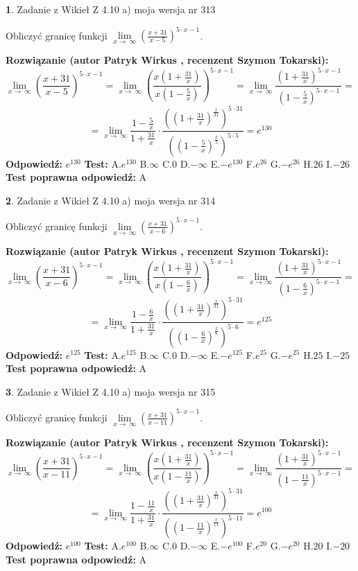 \documentclass[12pt, a4paper]{article}
\theoremstyle{definition} %
\newtheorem{zad}{}
\newcommand{\zadStart}[1]{\begin{zad}#1\newline}
\newcommand{\zadStop}{\end{zad}}
\newcommand{\rozwStart}[2]{\noindent \textbf{Rozwiązanie (autor #1 , recenzent #2): }\newline}
\newcommand{\rozwStop}{\newline}
\newcommand{\odpStart}{\noindent \textbf{Odpowiedź:}\newline}
\newcommand{\odpStop}{\newline}
\newcommand{\testStart}{\noindent \textbf{Test:}\newline}
\newcommand{\testStop}{\newline}
\newcommand{\kluczStart}{\noindent \textbf{Test poprawna odpowiedź:}\newline}
\newcommand{\kluczStop}{\newline}
\begin{document}
\zadStart{Zadanie z Wikieł Z 4.10 a) moja wersja nr 313}

Obliczyć granicę funkcji  $\lim\limits_{x\to\ \infty}(\frac{x+31}{x-5})^{5\cdot x-1}$.
\zadStop
\rozwStart{Patryk Wirkus}{Szymon Tokarski}
$$\lim\limits_{x\to\ \infty}(\frac{x+31}{x-5})^{5\cdot x-1} = \lim\limits_{x\to\ \infty}(\frac{x(1+\frac{31}{x})}{x(1-\frac{5}{x})})^{5\cdot x-1}=\lim\limits_{x\to\ \infty}\frac{(1+\frac{31}{x})^{5\cdot x-1}}{(1-\frac{5}{x})^{5\cdot x-1}}=$$
$$=\lim\limits_{x\to\ \infty}\frac{1-\frac{5}{x}}{1+\frac{31}{x}}\cdot\frac{((1+\frac{31}{x})^{\frac{x}{31}})^{5\cdot31}}{((1-\frac{5}{x})^{\frac{x}{5}})^{5\cdot5}}=e^{130}$$
\rozwStop
\odpStart
$e^{130}$
\odpStop
\testStart
A.$e^{130}$ B.$\infty$ C.$0$ D.$-\infty$ E.$-e^{130}$
F.$e^{26}$ G.$-e^{26}$
H.$26$
I.$-26$
\testStop
\kluczStart
A
\kluczStop



\zadStart{Zadanie z Wikieł Z 4.10 a) moja wersja nr 314}

Obliczyć granicę funkcji  $\lim\limits_{x\to\ \infty}(\frac{x+31}{x-6})^{5\cdot x-1}$.
\zadStop
\rozwStart{Patryk Wirkus}{Szymon Tokarski}
$$\lim\limits_{x\to\ \infty}(\frac{x+31}{x-6})^{5\cdot x-1} = \lim\limits_{x\to\ \infty}(\frac{x(1+\frac{31}{x})}{x(1-\frac{6}{x})})^{5\cdot x-1}=\lim\limits_{x\to\ \infty}\frac{(1+\frac{31}{x})^{5\cdot x-1}}{(1-\frac{6}{x})^{5\cdot x-1}}=$$
$$=\lim\limits_{x\to\ \infty}\frac{1-\frac{6}{x}}{1+\frac{31}{x}}\cdot\frac{((1+\frac{31}{x})^{\frac{x}{31}})^{5\cdot31}}{((1-\frac{6}{x})^{\frac{x}{6}})^{5\cdot6}}=e^{125}$$
\rozwStop
\odpStart
$e^{125}$
\odpStop
\testStart
A.$e^{125}$ B.$\infty$ C.$0$ D.$-\infty$ E.$-e^{125}$
F.$e^{25}$ G.$-e^{25}$
H.$25$
I.$-25$
\testStop
\kluczStart
A
\kluczStop



\zadStart{Zadanie z Wikieł Z 4.10 a) moja wersja nr 315}

Obliczyć granicę funkcji  $\lim\limits_{x\to\ \infty}(\frac{x+31}{x-11})^{5\cdot x-1}$.
\zadStop
\rozwStart{Patryk Wirkus}{Szymon Tokarski}
$$\lim\limits_{x\to\ \infty}(\frac{x+31}{x-11})^{5\cdot x-1} = \lim\limits_{x\to\ \infty}(\frac{x(1+\frac{31}{x})}{x(1-\frac{11}{x})})^{5\cdot x-1}=\lim\limits_{x\to\ \infty}\frac{(1+\frac{31}{x})^{5\cdot x-1}}{(1-\frac{11}{x})^{5\cdot x-1}}=$$
$$=\lim\limits_{x\to\ \infty}\frac{1-\frac{11}{x}}{1+\frac{31}{x}}\cdot\frac{((1+\frac{31}{x})^{\frac{x}{31}})^{5\cdot31}}{((1-\frac{11}{x})^{\frac{x}{11}})^{5\cdot11}}=e^{100}$$
\rozwStop
\odpStart
$e^{100}$
\odpStop
\testStart
A.$e^{100}$ B.$\infty$ C.$0$ D.$-\infty$ E.$-e^{100}$
F.$e^{20}$ G.$-e^{20}$
H.$20$
I.$-20$
\testStop
\kluczStart
A
\kluczStop
\end{document}
